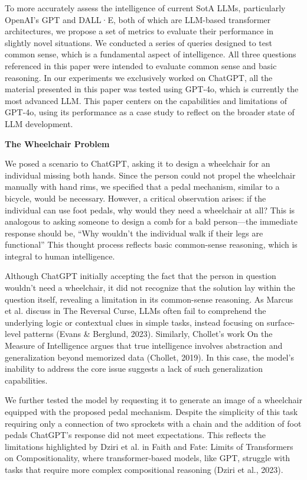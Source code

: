 \documentclass[11pt]{scrartcl}
\begin{document}
To more accurately assess the intelligence of current SotA LLMs, particularly OpenAI's GPT and DALL·E, both of which are LLM-based transformer architectures, we propose a set of metrics to evaluate their performance in slightly novel situations. We conducted a series of queries designed to test common sense, which is a fundamental aspect of intelligence. All three questions referenced in this paper were intended to evaluate common sense and basic reasoning. In our experiments we exclusively worked on ChatGPT, all the material presented in this paper was tested using GPT-4o, which is currently the most advanced LLM. This paper centers on the capabilities and limitations of GPT-4o, using its performance as a case study to reflect on the broader state of LLM development. \\

\begin{huge}
\textbf{The Wheelchair Problem}
\end{huge}
We posed a scenario to ChatGPT, asking it to design a wheelchair for an individual missing both hands. Since the person could not propel the wheelchair manually with hand rims, we specified that a pedal mechanism, similar to a bicycle, would be necessary. However, a critical observation arises: if the individual can use foot pedals, why would they need a wheelchair at all? This is analogous to asking someone to design a comb for a bald person—the immediate response should be, “Why wouldn’t the individual walk if their legs are functional” This thought process reflects basic common-sense reasoning, which is integral to human intelligence.

Although ChatGPT initially accepting the fact that the person in question wouldn’t need a wheelchair, it did not recognize that the solution lay within the question itself, revealing a limitation in its common-sense reasoning. As Marcus et al. discuss in The Reversal Curse\cite{ref1}, LLMs often fail to comprehend the underlying logic or contextual clues in simple tasks, instead focusing on surface-level patterns (Evans \& Berglund, 2023)\cite{ref1}. Similarly, Chollet’s work On the Measure of Intelligence argues that true intelligence involves abstraction and generalization beyond memorized data (Chollet, 2019)\cite{ref3}. In this case, the model’s inability to address the core issue suggests a lack of such generalization capabilities.

We further tested the model by requesting it to generate an image of a wheelchair equipped with the proposed pedal mechanism. Despite the simplicity of this task requiring only a connection of two sprockets with a chain and the addition of foot pedals ChatGPT’s response did not meet expectations. This reflects the limitations highlighted by Dziri et al. in Faith and Fate: Limits of Transformers on Compositionality, where transformer-based models, like GPT, struggle with tasks that require more complex compositional reasoning (Dziri et al., 2023)\cite{ref4}.
\end{document}
